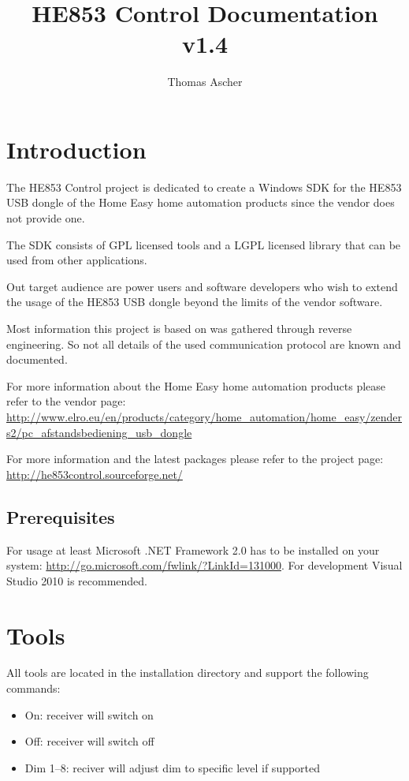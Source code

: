 \documentclass[
a4paper,
oneside,
halfparskip*,
normalheadings,
]
{scrbook}
\begin{document}
\title{HE853 Control Documentation v1.4}
\author{Thomas Ascher}
\maketitle
\tableofcontents
\mainmatter

\chapter{Introduction}

The HE853 Control project is dedicated to create a Windows SDK for the HE853 USB
dongle of the Home Easy home automation products since the vendor does not provide
one.

The SDK consists of GPL licensed tools and a LGPL licensed library that can be
used from other applications.

Out target audience are power users and software developers who wish to extend the
usage of the HE853 USB dongle beyond the limits of the vendor software.

Most information this project is based on was gathered through reverse engineering.
So not all details of the used communication protocol are known and documented.

For more information about the Home Easy home automation products please refer to
the vendor page: \url{http://www.elro.eu/en/products/category/home_automation/home_easy/zenders2/pc_afstandsbediening_usb_dongle}

For more information and the latest packages please refer to the project page:
\url{http://he853control.sourceforge.net/}

\section{Prerequisites}
For usage at least Microsoft .NET Framework 2.0 has to be installed on your
system: \url{http://go.microsoft.com/fwlink/?LinkId=131000}. For development
Visual Studio 2010 is recommended.




\chapter{Tools}

All tools are located in the installation directory and support the following commands:

\begin{itemize}
	\item On: receiver will switch on
	\item Off: receiver will switch off
	\item Dim 1--8: reciver will adjust dim to specific level if supported
\end{itemize}
\end{document}
